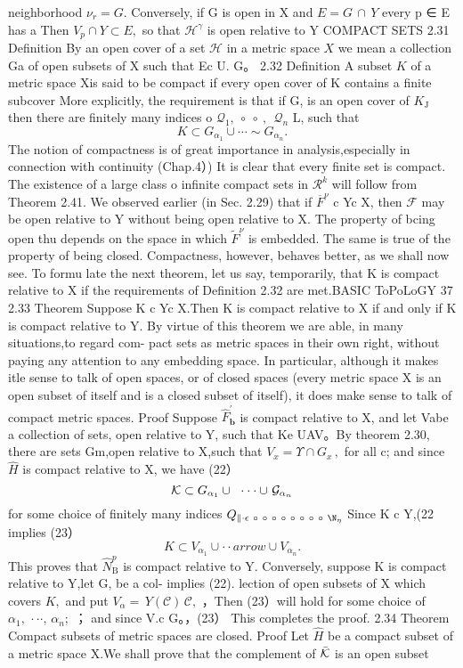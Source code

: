 neighborhood $\nu_{r}=G.$ Conversely, if G is open in X and $E=G\,\cap\,Y$ every p ∈ E has a Then $V_{p}\cap Y\subset E,$ so that ${\mathcal{H}}^{\gamma}$ is open relative to Y COMPACT SETS 2.31 Definition By an open cover of a set ${\mathcal{H}}$ in a metric space $X$ we mean a collection {Ga} of open subsets of X such that Ec U. G。 2.32 Definition A subset $\textstyle K$ of a metric space Xis said to be compact if every open cover of K contains a finite subcover More explicitly, the requirement is that if {G,} is an open cover of $K_{\mathrm{{J}}}$ then there are finitely many indices o ${\mathcal Q}_{1},\ \circ\ \circ\ ,\ \ {\mathcal Q}_{n}$ L, such that $$ K\subset G_{\alpha_{1}}\cup\cdots\sim G_{\alpha_{n}}. $$ The notion of compactness is of great importance in analysis,especially in connection with continuity (Chap.4）) It is clear that every finite set is compact. The existence of a large class o infinite compact sets in $\textstyle{\mathcal{R}}^{k}$ will follow from Theorem 2.41. We observed earlier (in Sec. 2.29) that if ${\overline{{F}}}^{\nu}$ c Yc X, then ${\mathcal{F}}$ may be open relative to Y without being open relative to X. The property of bcing open thu depends on the space in which ${\widetilde{F}}^{\nu}$ is embedded. The same is true of the property of being closed. Compactness, however, behaves better, as we shall now see. To formu late the next theorem, let us say, temporarily, that K is compact relative to X if the requirements of Definition 2.32 are met.BASIC ToPoLoGY 37 2.33 Theorem Suppose K c Yc X.Then K is compact relative to X if and only if K is compact relative to Y. By virtue of this theorem we are able, in many situations,to regard com- pact sets as metric spaces in their own right, without paying any attention to any embedding space. In particular, although it makes itle sense to talk of open spaces, or of closed spaces (every metric space X is an open subset of itself and is a closed subset of itself), it does make sense to talk of compact metric spaces. Proof Suppose ${\widehat{F}}_{\mathbf{b}}^{\prime}$ is compact relative to X, and let {Va}be a collection of sets, open relative to Y, such that Ke UAV。By theorem 2.30, there are sets Gm,open relative to X,such that $V_{x}=\Upsilon\cap G_{x}\,,$ for all c; and since ${\hat{H}}$ is compact relative to X, we have (22） $$ {\cal K}\subset G_{\alpha_{1}}\cup\ ^{}\cdot\cdot\cdot\cup\ {\cal G}_{\alpha_{n}} $$ for some choice of finitely many indices $Q_{\parallel\cdot\mathbf{\epsilon}\ \circ\ \circ\ \circ\ \circ\ \circ\ \circ\ \circ\ \circ\ \N_{\eta}}$ Since K c Y,(22 implies (23） $$ K\subset V_{\alpha_{1}}\cup\cdot\cdot arrow\cup V_{\alpha_{n}}. $$ This proves that ${\widehat{N}}_{\mathrm{{B}}}^{p}$ is compact relative to Y. Conversely, suppose K is compact relative to Y,let {G,} be a col- implies (22). lection of open subsets of X which covers $K,$ and put $V_{\alpha}=\,Y\left(\mathcal{C}\right)\,\mathcal{C},$ ，Then (23）will hold for some choice of $\alpha_{1},\,\cdot\cdot\cdot,\,\alpha_{n};$ ； and since V.c G。，(23） This completes the proof. 2.34 Theorem Compact subsets of metric spaces are closed. Proof Let ${\hat{H}}$ be a compact subset of a metric space X.We shall prove that the complement of ${\bar{\cal K}}$ is an open subset 